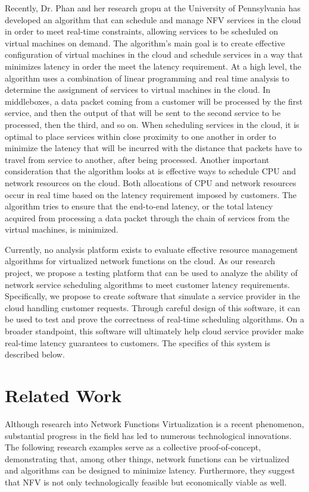 \documentclass{sig-alternate}
\begin{document}
Recently, Dr. Phan and her research gropu at the University of Pennsylvania has developed an algorithm that can schedule and manage NFV services in the cloud in order to meet real-time constraints, allowing services to be scheduled on virtual machines on demand. The algorithm's main goal is to create effective configuration of virtual machines in the cloud and schedule services in a way that minimizes latency in order the meet the latency requirement. At a high level, the algorithm uses a combination of linear programming and real time analysis to determine the assignment of services to virtual machines in the cloud. In middleboxes, a data packet coming from a customer will be processed by the first service, and then the output of that will be sent to the second service to be processed, then the third, and so on. When scheduling services in the cloud, it is optimal to place services within close proximity to one another in order to minimize the latency that will be incurred with the distance that packets have to travel from service to another, after being processed. Another important consideration that the algorithm looks at is effective ways to schedule CPU and network resources on the cloud. Both allocations of CPU and network resources occur in real time based on the latency requirement imposed by customers. The algorithm tries to ensure that the end-to-end latency, or the total latency acquired from processing a data packet through the chain of services from the virtual machines, is minimized.

Currently, no analysis platform exists to evaluate effective resource management algorithms for virtualized network functions on the cloud. As our research project, we propose a testing platform that can be used to analyze the ability of network service scheduling algorithms to meet customer latency requirements. Specifically, we propose to create software that simulate a service provider in the cloud handling customer requests. Through careful design of this software, it can be used to test and prove the correctness of real-time scheduling algorithms. On a broader standpoint, this software will ultimately help cloud service provider make real-time latency guarantees to customers. The specifics of this system is described below.
\section{Related Work}
\label{sec:related_work}
Although research into Network Functions Virtualization is a recent phenomenon, substantial progress in the field has led to numerous technological innovations. The following research examples serve as a collective proof-of-concept, demonstrating that, among other things, network functions can be virtualized and algorithms can be designed to minimize latency. Furthermore, they suggest that NFV is not only technologically feasible but economically viable as well.
\end{document}
